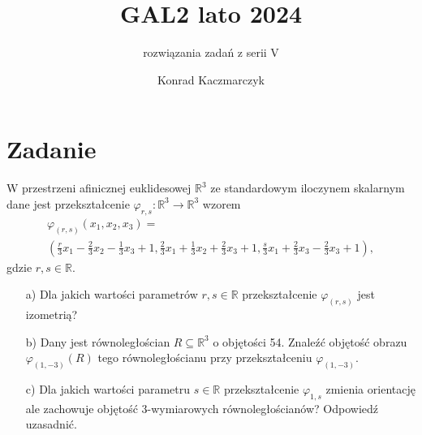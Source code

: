 \documentclass[11pt]{scrartcl}
\author{Konrad Kaczmarczyk}
\begin{document}
  \title{GAL2 lato 2024}
  \subtitle{rozwiązania zadań z serii V}
  \maketitle
    \section{Zadanie}
        \begin{zadanie}
            W przestrzeni afinicznej euklidesowej $\mathbb{R}^3$ ze standardowym iloczynem skalarnym dane jest przekształcenie $\varphi_{r,s} : \mathbb{R}^3 \to \mathbb{R}^3$ wzorem
            \begin{gather*}
                \varphi_{(r,s)}(x_1, x_2, x_3) = \\
                \left( \frac{r}{3} x_1 - \frac{2}{3} x_2 - \frac{1}{3} x_3 + 1, 
                    \frac{2}{3} x_1 + \frac{1}{3} x_2 + \frac{2}{3} x_3 + 1, 
                    \frac{s}{3} x_1 + \frac{2}{3} x_3 - \frac{2}{3} x_3 + 1 
                \right),
            \end{gather*}
            gdzie $r,s \in \mathbb{R}$.

\begin{itemize}
    \item[a)] Dla jakich wartości parametrów $r, s \in \mathbb{R}$ przekształcenie $\varphi_{(r,s)}$ jest izometrią?
    \item[b)] Dany jest równoległościan $R \subseteq \mathbb{R}^3$ o objętości 54. Znaleźć objętość obrazu $\varphi_{(1,-3)}(R)$ tego równoległościanu przy przekształceniu $\varphi_{(1,-3)}$.
    \item[c)] Dla jakich wartości parametru $s \in \mathbb{R}$ przekształcenie $\varphi_{1,s}$ zmienia orientację ale zachowuje objętość 3-wymiarowych równoległościanów? Odpowiedź uzasadnić.
\end{itemize}
        \end{zadanie}
        
\end{document}
